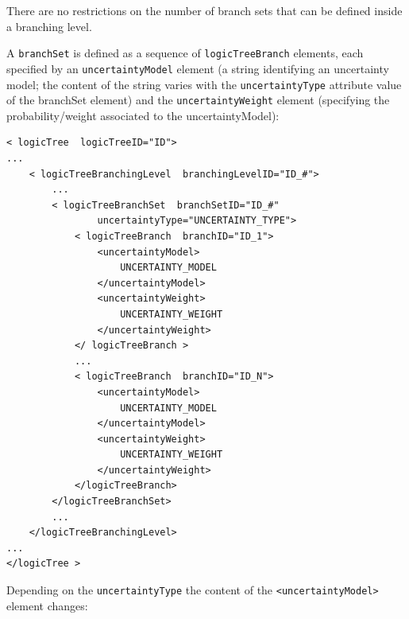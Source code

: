 There are no restrictions on the number of branch sets that can be defined inside a branching level.

A \Verb+branchSet+ is defined as a sequence of \Verb+logicTreeBranch+
elements, each specified by an \Verb+uncertaintyModel+ element (a string
identifying an uncertainty model; the content of the string varies with the \texttt{uncertaintyType} attribute value of the branchSet element) and the \texttt{uncertaintyWeight} element (specifying the probability/weight associated to the uncertaintyModel):

\begin{verbatim}
< logicTree  logicTreeID="ID">
...
	< logicTreeBranchingLevel  branchingLevelID="ID_#">
		...
		< logicTreeBranchSet  branchSetID="ID_#"
				uncertaintyType="UNCERTAINTY_TYPE">
			< logicTreeBranch  branchID="ID_1">
				<uncertaintyModel>
				    UNCERTAINTY_MODEL
				</uncertaintyModel>
				<uncertaintyWeight>
				    UNCERTAINTY_WEIGHT
				</uncertaintyWeight>
			</ logicTreeBranch >
			...
			< logicTreeBranch  branchID="ID_N">
				<uncertaintyModel>
				    UNCERTAINTY_MODEL
				</uncertaintyModel>
				<uncertaintyWeight>
				    UNCERTAINTY_WEIGHT
				</uncertaintyWeight>
			</logicTreeBranch>
		</logicTreeBranchSet>
		...
	</logicTreeBranchingLevel>
...
</logicTree >
\end{verbatim}

Depending on the \Verb+uncertaintyType+ the content of the
\Verb+<uncertaintyModel>+ element changes:


